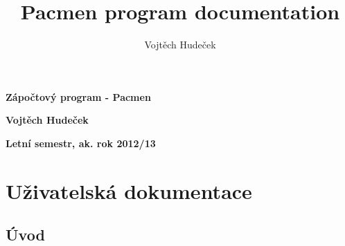 \documentclass[10pt,a4paper]{article}
\author{Vojtěch Hudeček}
\title{Pacmen program documentation}
\begin{document}
\begin{center}

\begin{LARGE}
\textbf{Zápočtový program - Pacmen }

\textbf{Vojtěch Hudeček}

\textbf{Letní semestr, ak. rok 2012/13}
\linebreak 
\chapter{Uživatelská dokumentace}
\end{LARGE}
\end{center}
\section{Úvod}
\end{document}
